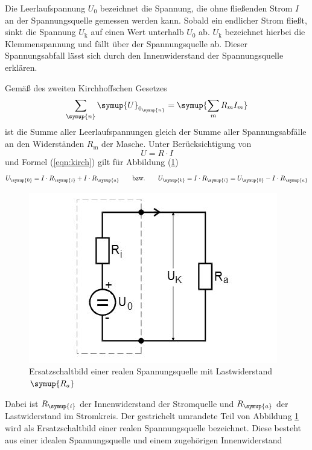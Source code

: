 Die Leerlaufspannung $U_{\text{0}}$ bezeichnet die Spannung, die ohne
fließenden Strom $I$ an der Spannungsquelle gemessen werden kann.
Sobald ein endlicher Strom fließt, sinkt die Spannung $U_{\text{k}}$ auf einen
Wert unterhalb $U_{\text{0}}$ ab. $U_{\text{k}}$ bezeichnet hierbei die
Klemmenspannung und fällt über der Spannungsquelle ab.
Dieser Spannungsabfall lässt sich durch den Innenwiderstand der Spannungsquelle
erklären.

Gemäß des zweiten Kirchhoffschen Gesetzes
\begin{equation}
  \sum_\symup{n} \symup{U}_{0_\symup{n}} = \symup{\sum_m R_m I_m}
  \label{eqn:kirch}
\end{equation}
ist die Summe aller Leerlaufspannungen gleich der Summe aller
Spannungsabfälle an den Widerständen $R_\text{m}$ der Masche.
Unter Berücksichtigung von
\begin{equation}
  U=R\cdot I
\end{equation}
und Formel (\ref{eqn:kirch}) gilt für Abbildung (\ref{fig:real})
\begin{equation}
  U_\symup{0}=I \cdot R_\symup{i} + I \cdot R_\symup{a}
  \qquad
  \text{bzw.}
  \qquad
  U_\symup{k}=I \cdot R_\symup{i} = U_\symup{0} - I \cdot R_\symup{a}
  \label{eqn:U0k}
\end{equation}
\begin{figure}[H]
   \centering
  \includegraphics{bilder/real}
  \caption{Ersatzschaltbild einer realen Spannungsquelle mit Lastwiderstand
  $\symup{R_a}$ \cite{301}}
  \label{fig:real}
\end{figure}
Dabei ist $R_\symup{i}$ der Innenwiderstand der Stromquelle und $R_\symup{a}$
der Lastwiderstand im Stromkreis.
Der gestrichelt umrandete Teil von Abbildung \ref{fig:real} wird als
Ersatzschaltbild einer realen Spannungsquelle bezeichnet. Diese besteht aus
einer idealen Spannungsquelle und einem zugehörigen Innenwiderstand
